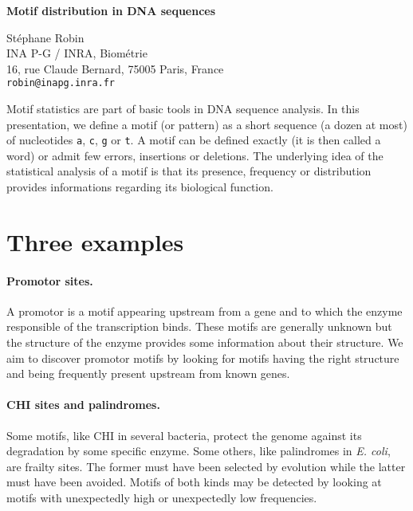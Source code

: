 \documentclass[11pt,a4paper,french]{article}
\begin{document}

\begin{center}
  {\Large \bf Motif distribution in DNA sequences}

  {\large St\'ephane {\sc Robin} \\
  INA P-G / INRA, Biom\'etrie \\
  16, rue Claude Bernard, 75005 Paris, {\sc France} \\
  {\tt robin@inapg.inra.fr}}

\end{center}

Motif statistics are part of basic tools in DNA sequence analysis.  In
this presentation, we define a motif (or pattern) as a short sequence
(a dozen at most) of nucleotides {\tt a}, {\tt c}, {\tt g} or {\tt t}.
A motif can be defined exactly (it is then called a word) or admit few
errors, insertions or deletions. The underlying idea of the
statistical analysis of a motif is that its presence, frequency or
distribution provides informations regarding its biological function.

\section*{Three examples}

\paragraph{Promotor sites.}
A promotor is a motif appearing upstream from a gene and to which the
enzyme responsible of the transcription binds. These motifs are
generally unknown but the structure of the enzyme provides some
information about their structure. We aim to discover promotor motifs
by looking for motifs having the right structure and being frequently
present upstream from known genes.

\paragraph{CHI sites and palindromes.}
Some motifs, like CHI in several bacteria, protect the genome against
its degradation by some specific enzyme. Some others, like palindromes
in {\em E. coli}, are frailty sites. The former must have been
selected by evolution while the latter must have been avoided. Motifs
of both kinds may be detected by looking at motifs with unexpectedly
high or unexpectedly low frequencies.
\end{document}
